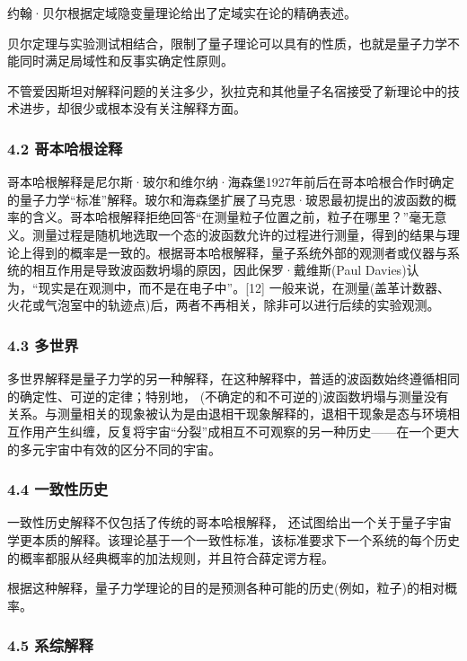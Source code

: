 约翰·贝尔根据定域隐变量理论给出了定域实在论的精确表述。

贝尔定理与实验测试相结合，限制了量子理论可以具有的性质，也就是量子力学不能同时满足局域性和反事实确定性原则。

不管爱因斯坦对解释问题的关注多少，狄拉克和其他量子名宿接受了新理论中的技术进步，却很少或根本没有关注解释方面。

\subsubsection{4.2 哥本哈根诠释}

哥本哈根解释是尼尔斯·玻尔和维尔纳·海森堡1927年前后在哥本哈根合作时确定的量子力学“标准”解释。玻尔和海森堡扩展了马克思·玻恩最初提出的波函数的概率的含义。哥本哈根解释拒绝回答“在测量粒子位置之前，粒子在哪里？”毫无意义。测量过程是随机地选取一个态的波函数允许的过程进行测量，得到的结果与理论上得到的概率是一致的。根据哥本哈根解释，量子系统外部的观测者或仪器与系统的相互作用是导致波函数坍塌的原因，因此保罗·戴维斯(Paul Davies)认为，“现实是在观测中，而不是在电子中”。[12] 一般来说，在测量(盖革计数器、火花或气泡室中的轨迹点)后，两者不再相关，除非可以进行后续的实验观测。

\subsubsection{4.3 多世界}

多世界解释是量子力学的另一种解释，在这种解释中，普适的波函数始终遵循相同的确定性、可逆的定律；特别地， (不确定的和不可逆的)波函数坍塌与测量没有关系。与测量相关的现象被认为是由退相干现象解释的，退相干现象是态与环境相互作用产生纠缠，反复将宇宙“分裂”成相互不可观察的另一种历史——在一个更大的多元宇宙中有效的区分不同的宇宙。

\subsubsection{4.4 一致性历史}

一致性历史解释不仅包括了传统的哥本哈根解释， 还试图给出一个关于量子宇宙学更本质的解释。该理论基于一个一致性标准，该标准要求下一个系统的每个历史的概率都服从经典概率的加法规则，并且符合薛定谔方程。

根据这种解释，量子力学理论的目的是预测各种可能的历史(例如，粒子)的相对概率。

\subsubsection{4.5 系综解释}


